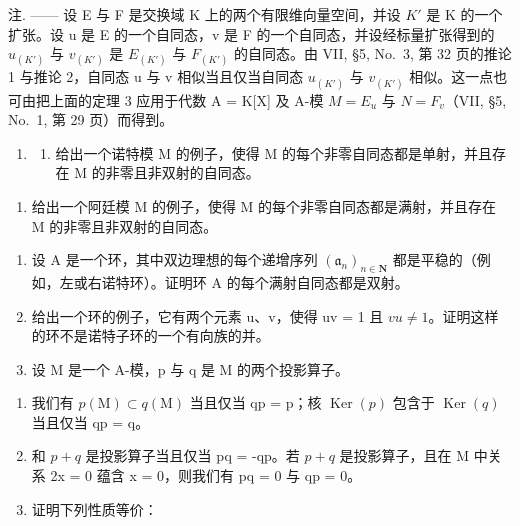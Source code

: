 注. —— 设 E 与 F 是交换域 K 上的两个有限维向量空间，并设 \(K'\) 是 K 的一个扩张。设 u 是 E 的一个自同态，v 是 F 的一个自同态，并设经标量扩张得到的 \(u_{(K')}\) 与 \(v_{(K')}\) 是 \(E_{(K')}\) 与 \(F_{(K')}\) 的自同态。由 VII, §5, No.~3, 第 32 页的推论 1 与推论 2，自同态 u 与 v 相似当且仅当自同态 \(u_{(K')}\) 与 \(v_{(K')}\) 相似。这一点也可由把上面的定理 3 应用于代数 A = K{[}X{]} 及 A-模 \(M = E_u\) 与 \(N = F_v\)（VII, §5, No.~1, 第 29 页）而得到。


\begin{enumerate}
\def\labelenumi{\arabic{enumi})}
\tightlist
\item
  \begin{enumerate}
  \def\labelenumii{\alph{enumii})}
  \tightlist
  \item
    给出一个诺特模 M 的例子，使得 M 的每个非零自同态都是单射，并且存在 M 的非零且非双射的自同态。
  \end{enumerate}
\end{enumerate}

\begin{enumerate}
\def\labelenumi{\alph{enumi})}
\setcounter{enumi}{1}
\tightlist
\item
  给出一个阿廷模 M 的例子，使得 M 的每个非零自同态都是满射，并且存在 M 的非零且非双射的自同态。
\end{enumerate}

\begin{enumerate}
\def\labelenumi{\arabic{enumi})}
\setcounter{enumi}{1}
\item
  设 \(\mathrm{A}\) 是一个环，其中双边理想的每个递增序列 \((\mathfrak{a}_n)_{n\in \mathbf{N}}\) 都是平稳的（例如，左或右诺特环）。证明环 \(\mathrm{A}\) 的每个满射自同态都是双射。
\item
  给出一个环的例子，它有两个元素 u、v，使得 uv = 1 且 \(vu \neq 1\)。证明这样的环不是诺特子环的一个有向族的并。
\item
  设 M 是一个 A-模，p 与 q 是 M 的两个投影算子。
\end{enumerate}

\begin{enumerate}
\def\labelenumi{\alph{enumi})}
\item
  我们有 \(p(\mathrm{M}) \subset q(\mathrm{M})\) 当且仅当 qp = p；核 \(\operatorname{Ker}(p)\) 包含于 \(\operatorname{Ker}(q)\) 当且仅当 qp = q。
\item
  和 \(p + q\) 是投影算子当且仅当 pq = -qp。若 \(p + q\) 是投影算子，且在 M 中关系 2x = 0 蕴含 x = 0，则我们有 pq = 0 与 qp = 0。
\item
  证明下列性质等价：
\end{enumerate}

